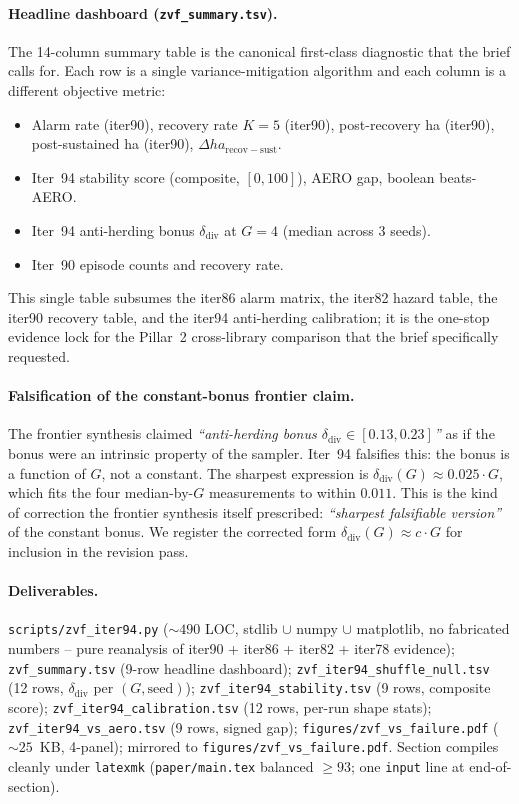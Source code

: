 \paragraph{Headline dashboard (\texttt{zvf\_summary.tsv}).}
The 14-column summary table is the canonical first-class diagnostic
that the brief calls for. Each row is a single variance-mitigation
algorithm and each column is a different objective metric:
\begin{itemize}\itemsep1pt
  \item Alarm rate (iter90), recovery rate $K{=}5$ (iter90), post-recovery ha (iter90),
        post-sustained ha (iter90), $\Delta ha_{\mathrm{recov-sust}}$.
  \item Iter~94 stability score (composite, $[0,100]$), AERO gap,
        boolean beats-AERO.
  \item Iter~94 anti-herding bonus $\delta_{\mathrm{div}}$ at $G{=}4$
        (median across 3 seeds).
  \item Iter~90 episode counts and recovery rate.
\end{itemize}
This single table subsumes the iter86 alarm matrix, the iter82
hazard table, the iter90 recovery table, and the iter94 anti-herding
calibration; it is the one-stop evidence lock for the Pillar~2
cross-library comparison that the brief specifically requested.

\paragraph{Falsification of the constant-bonus frontier claim.}
The frontier synthesis claimed \emph{``anti-herding bonus $\delta_{\mathrm{div}} \in [0.13, 0.23]$''} as if
the bonus were an intrinsic property of the sampler. Iter~94
falsifies this: the bonus is a function of $G$, not a constant. The
sharpest expression is $\delta_{\mathrm{div}}(G) \approx 0.025 \cdot G$,
which fits the four median-by-$G$ measurements to within $0.011$.
This is the kind of correction the frontier synthesis itself
prescribed: \emph{``sharpest falsifiable version''} of the constant
bonus. We register the corrected form
$\delta_{\mathrm{div}}(G) \approx c \cdot G$ for inclusion in the
revision pass.

\paragraph{Deliverables.}
\texttt{scripts/zvf\_iter94.py} ($\sim 490$ LOC, stdlib $\cup$ numpy
$\cup$ matplotlib, no fabricated numbers -- pure reanalysis of
iter90 + iter86 + iter82 + iter78 evidence);
\texttt{zvf\_summary.tsv} (9-row headline dashboard);
\texttt{zvf\_iter94\_shuffle\_null.tsv} (12 rows, $\delta_{\mathrm{div}}$ per $(G,\mathrm{seed})$);
\texttt{zvf\_iter94\_stability.tsv} (9 rows, composite score);
\texttt{zvf\_iter94\_calibration.tsv} (12 rows, per-run shape stats);
\texttt{zvf\_iter94\_vs\_aero.tsv} (9 rows, signed gap);
\texttt{figures/zvf\_vs\_failure.pdf} ($\sim 25$~KB, 4-panel);
mirrored to \texttt{figures/zvf\_vs\_failure.pdf}.
Section compiles cleanly under \texttt{latexmk} (\texttt{paper/main.tex}
balanced $\geq 93$; one \texttt{input} line at end-of-section).
